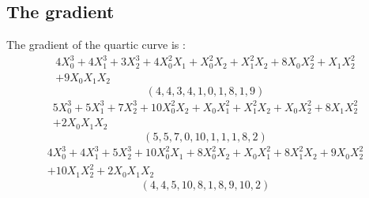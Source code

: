 \documentclass{article}
\begin{document}
{\subsection*{The gradient}
The gradient of the quartic curve  is :
$$
\begin{array}{c}
4X_0^3 + 4X_1^3 + 3X_2^3 + 4X_0^2X_1 + X_0^2X_2 + X_1^2X_2 + 8X_0X_2^2 + X_1X_2^2\\
 + 9X_0X_1X_2\end{array}
$$
$$
( 4, 4, 3, 4, 1, 0, 1, 8, 1, 9 )$$
$$
\begin{array}{c}
5X_0^3 + 5X_1^3 + 7X_2^3 + 10X_0^2X_2 + X_0X_1^2 + X_1^2X_2 + X_0X_2^2 + 8X_1X_2^2\\
 + 2X_0X_1X_2\end{array}
$$
$$
( 5, 5, 7, 0, 10, 1, 1, 1, 8, 2 )$$
$$
\begin{array}{c}
4X_0^3 + 4X_1^3 + 5X_2^3 + 10X_0^2X_1 + 8X_0^2X_2 + X_0X_1^2 + 8X_1^2X_2 + 9X_0X_2^2\\
 + 10X_1X_2^2 + 2X_0X_1X_2\end{array}
$$
$$
( 4, 4, 5, 10, 8, 1, 8, 9, 10, 2 )$$


%


%


}%
\end{document}
